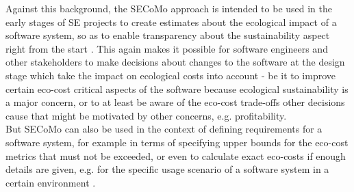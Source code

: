 \documentclass[oribibl]{llncs}
\begin{document}
Against this background, the SECoMo approach is intended to be used in the early stages of SE projects to create estimates about the ecological impact of a software system, so as to enable transparency about the sustainability aspect right from the start \cite{schulze_cost_2016}. This again makes it possible for software engineers and other stakeholders to make decisions about changes to the software at the design stage which take the impact on ecological costs into account %
- be it to improve certain eco-cost critical aspects of the software because ecological sustainability is a major concern, or to at least be aware of the eco-cost trade-offs other decisions cause that might be motivated by other concerns, e.g. profitability. \cite{schulze_cost_2016}\\ %
But SECoMo can also be used in the context of defining requirements for a software system, for example in terms of specifying upper bounds for the eco-cost metrics that must not be exceeded, or even to calculate exact eco-costs if enough details are given, e.g. for the specific usage scenario of a software system in a certain environment %
\cite{schulze_cost_2016}.\\
\end{document}
